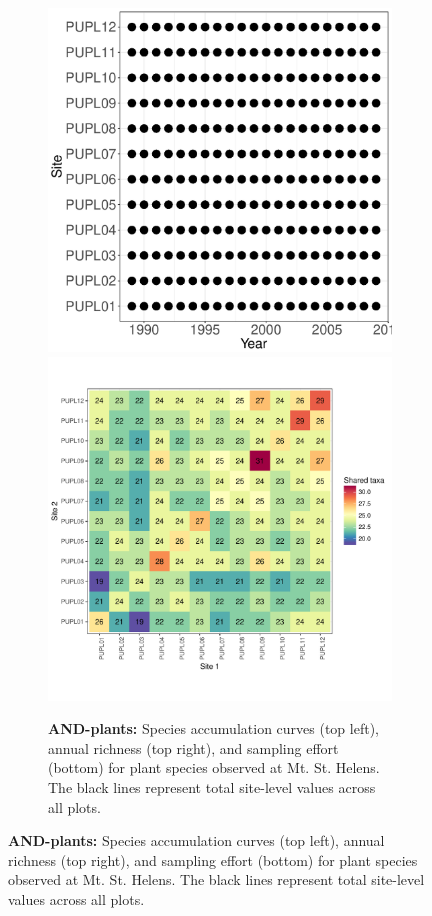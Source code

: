 \documentclass[11pt, oneside]{article}
\begin{document}
\begin{figure}[h!]
\begin{figure}[h!]
\includegraphics[scale = 0.4]{and-plants-mtStHelens_spatiotemporal_sampling_effort.pdf}
\includegraphics[scale = 0.4]{and-plants-mtStHelens_spp_shared.pdf}
\caption{{\bf AND-plants:} Species accumulation curves (top left),  annual richness (top right), and sampling effort (bottom)  for plant species observed at Mt. St. Helens. The black lines represent total site-level values across all plots.}
\label{and-plants}
\end{figure}



\end{figure}
\end{document}
